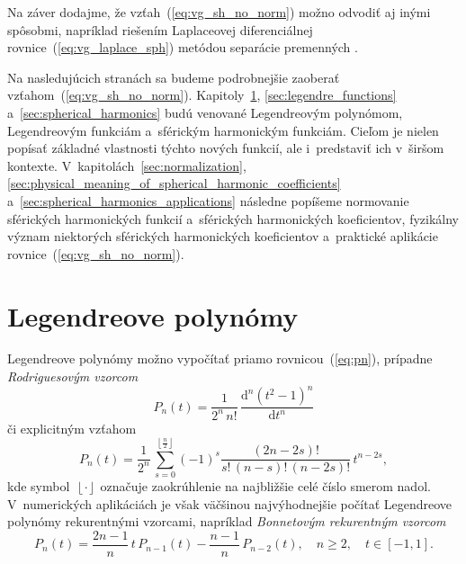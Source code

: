 \documentclass[a4paper, 12pt]{book}
\newcommand{\diff}{\mathrm d}
\begin{document}
Na záver dodajme, že vzťah~(\ref{eq:vg_sh_no_norm}) možno odvodiť aj inými 
spôsobmi, napríklad riešením Laplaceovej diferenciálnej 
rovnice~(\ref{eq:vg_laplace_sph}) metódou separácie premenných 
\parencite{MoritzPhysicalGeodesy,Janak2006}.

Na nasledujúcich stranách sa budeme podrobnejšie zaoberať 
vzťahom~(\ref{eq:vg_sh_no_norm}).  Kapitoly~\ref{sec:legendre_polynomials}, 
\ref{sec:legendre_functions} a~\ref{sec:spherical_harmonics} budú venované 
Legendreovým polynómom, Legendreovým funkciám a~sférickým harmonickým funkciám.  
Cieľom je nielen popísať základné vlastnosti týchto nových funkcií, ale 
i~predstaviť ich v~širšom kontexte.  V~kapitolách~\ref{sec:normalization}, 
\ref{sec:physical_meaning_of_spherical_harmonic_coefficients} 
a~\ref{sec:spherical_harmonics_applications} následne popíšeme normovanie 
sférických harmonických funkcií a~sférických harmonických koeficientov, 
fyzikálny význam niektorých sférických harmonických koeficientov a~praktické 
aplikácie rovnice~(\ref{eq:vg_sh_no_norm}).






\section{Legendreove polynómy}
\label{sec:legendre_polynomials}

Legendreove polynómy možno vypočítať priamo rovnicou~(\ref{eq:pn}), prípadne 
\emph{Rodriguesovým vzorcom} \parencite{SansoGeoidDetermination}
%
\begin{equation}
\label{eq:pn_rodrigues}
P_n(t) = \frac{1}{2^n \, n!} \, \frac{\diff^n (t^2 - 1)^n}{\diff t^n}
\end{equation}
%
či explicitným vzťahom \parencite{Freeden2009}
%
\begin{equation}
P_n(t) = \frac{1}{2^n} \, \sum_{s = 0}^{\left\lfloor \frac{n}{2} \right\rfloor}
(-1)^s \frac{(2n - 2s)!}{s!  \, (n - s)! \, (n - 2s)!} \, t^{n - 2s}{,}
\end{equation}
%
kde symbol~$\left\lfloor \cdot \right\rfloor$ označuje zaokrúhlenie na 
najbližšie celé číslo smerom nadol.  V~numerických aplikáciách je však väčšinou 
najvýhodnejšie počítať Legendreove polynómy rekurentnými vzorcami, napríklad 
\emph{Bonnetovým rekurentným vzorcom}
%
\begin{equation}
\label{eq:pn_bonnet}
P_n(t) = \frac{2n - 1}{n} \, t \, P_{n - 1}(t) - \frac{n - 1}{n} \, P_{n
- 2}(t){,} \quad n \geq 2{,} \quad t \in [-1, 1]{.}
\end{equation}
\end{document}
